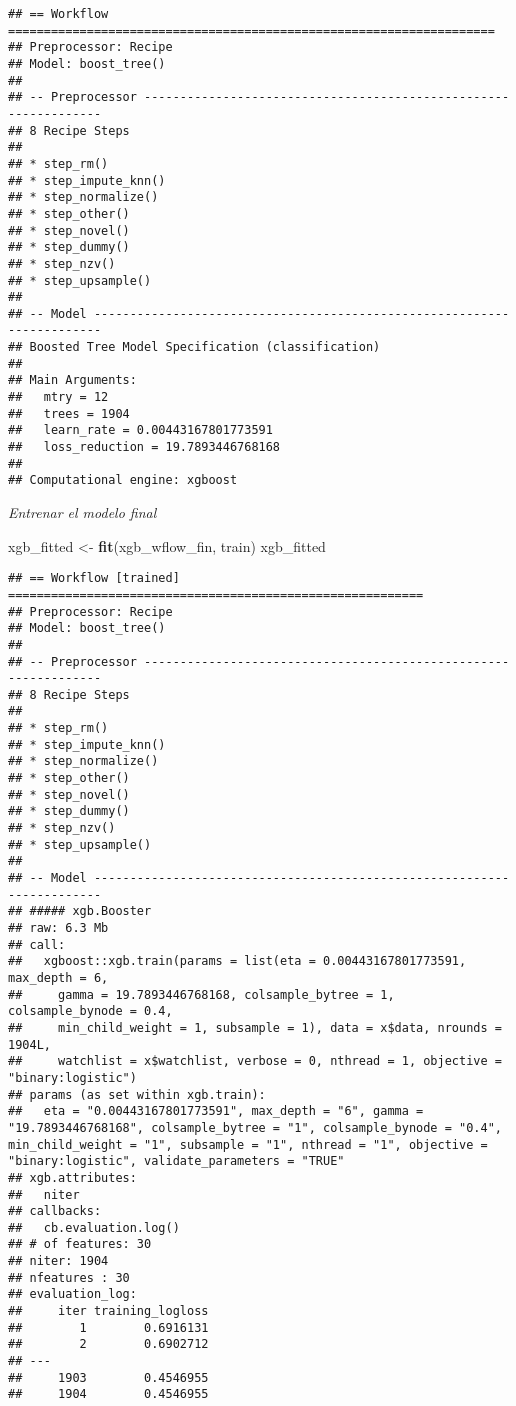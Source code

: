 \documentclass[
]{article}
\newenvironment{Shaded}{\begin{snugshade}}{\end{snugshade}}
\newcommand{\FunctionTok}[1]{\textcolor[rgb]{0.13,0.29,0.53}{\textbf{#1}}}
\newcommand{\NormalTok}[1]{#1}
\newcommand{\OtherTok}[1]{\textcolor[rgb]{0.56,0.35,0.01}{#1}}
\begin{document}
\begin{verbatim}
## == Workflow ====================================================================
## Preprocessor: Recipe
## Model: boost_tree()
## 
## -- Preprocessor ----------------------------------------------------------------
## 8 Recipe Steps
## 
## * step_rm()
## * step_impute_knn()
## * step_normalize()
## * step_other()
## * step_novel()
## * step_dummy()
## * step_nzv()
## * step_upsample()
## 
## -- Model -----------------------------------------------------------------------
## Boosted Tree Model Specification (classification)
## 
## Main Arguments:
##   mtry = 12
##   trees = 1904
##   learn_rate = 0.00443167801773591
##   loss_reduction = 19.7893446768168
## 
## Computational engine: xgboost
\end{verbatim}

\emph{Entrenar el modelo final}

\begin{Shaded}
\begin{Highlighting}[]
\NormalTok{xgb\_fitted }\OtherTok{\textless{}{-}} \FunctionTok{fit}\NormalTok{(xgb\_wflow\_fin, train)}
\NormalTok{xgb\_fitted}
\end{Highlighting}
\end{Shaded}

\begin{verbatim}
## == Workflow [trained] ==========================================================
## Preprocessor: Recipe
## Model: boost_tree()
## 
## -- Preprocessor ----------------------------------------------------------------
## 8 Recipe Steps
## 
## * step_rm()
## * step_impute_knn()
## * step_normalize()
## * step_other()
## * step_novel()
## * step_dummy()
## * step_nzv()
## * step_upsample()
## 
## -- Model -----------------------------------------------------------------------
## ##### xgb.Booster
## raw: 6.3 Mb 
## call:
##   xgboost::xgb.train(params = list(eta = 0.00443167801773591, max_depth = 6, 
##     gamma = 19.7893446768168, colsample_bytree = 1, colsample_bynode = 0.4, 
##     min_child_weight = 1, subsample = 1), data = x$data, nrounds = 1904L, 
##     watchlist = x$watchlist, verbose = 0, nthread = 1, objective = "binary:logistic")
## params (as set within xgb.train):
##   eta = "0.00443167801773591", max_depth = "6", gamma = "19.7893446768168", colsample_bytree = "1", colsample_bynode = "0.4", min_child_weight = "1", subsample = "1", nthread = "1", objective = "binary:logistic", validate_parameters = "TRUE"
## xgb.attributes:
##   niter
## callbacks:
##   cb.evaluation.log()
## # of features: 30 
## niter: 1904
## nfeatures : 30 
## evaluation_log:
##     iter training_logloss
##        1        0.6916131
##        2        0.6902712
## ---                      
##     1903        0.4546955
##     1904        0.4546955
\end{verbatim}
\end{document}
